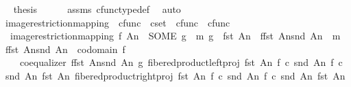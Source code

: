 \begin{isabellebody}
\ \isamarkupfalse%
\ {\isacharquery}{\kern0pt}thesis\isanewline
\ \ \ \ \isamarkupfalse%
\ assms{\isacharparenleft}{\kern0pt}{}{\isacharparenright}{\kern0pt}\ cfunc{\isacharunderscore}{\kern0pt}type{\isacharunderscore}{\kern0pt}def\ \isamarkupfalse%
\ auto\isanewline
{}\isamarkupfalse%
%
\endisatagproof
{\isafoldproof}%
%
\isadelimproof
\isanewline
%
\endisadelimproof
\isanewline
{}\isamarkupfalse%
\ image{\isacharunderscore}{\kern0pt}restriction{\isacharunderscore}{\kern0pt}mapping\ {\isacharcolon}{\kern0pt}{\isacharcolon}{\kern0pt}\ {\isachardoublequoteopen}cfunc\ {\isasymRightarrow}\ cset\ {\isasymtimes}\ cfunc\ {\isasymRightarrow}\ cfunc{\isachardoublequoteclose}\ {\isacharparenleft}{\kern0pt}{\isachardoublequoteopen}{\isacharunderscore}{\kern0pt}{\isasymrestriction}\isactrlbsub {\isacharunderscore}{\kern0pt}\isactrlesub {\isachardoublequoteclose}\ {\isacharbrackleft}{\kern0pt}{}{}{}{\isacharcomma}{\kern0pt}{}{\isacharbrackright}{\kern0pt}{}{}{}{\isacharparenright}{\kern0pt}\ \isanewline
\ \ {\isachardoublequoteopen}image{\isacharunderscore}{\kern0pt}restriction{\isacharunderscore}{\kern0pt}mapping\ f\ An\ {\isacharequal}{\kern0pt}\ {\isacharparenleft}{\kern0pt}SOME\ g{\isachardot}{\kern0pt}\ {\isasymexists}\ m{\isachardot}{\kern0pt}\ g\ {\isacharcolon}{\kern0pt}\ fst\ An\ {\isasymrightarrow}\ f{\isasymlparr}fst\ An{\isasymrparr}\isactrlbsub snd\ An\isactrlesub \ {\isasymand}\ m\ {\isacharcolon}{\kern0pt}\ f{\isasymlparr}fst\ An{\isasymrparr}\isactrlbsub snd\ An\isactrlesub \ {\isasymrightarrow}\ codomain\ f\ {\isasymand}\isanewline
\ \ \ \ coequalizer\ {\isacharparenleft}{\kern0pt}f{\isasymlparr}fst\ An{\isasymrparr}\isactrlbsub snd\ An\isactrlesub {\isacharparenright}{\kern0pt}\ g\ {\isacharparenleft}{\kern0pt}fibered{\isacharunderscore}{\kern0pt}product{\isacharunderscore}{\kern0pt}left{\isacharunderscore}{\kern0pt}proj\ {\isacharparenleft}{\kern0pt}fst\ An{\isacharparenright}{\kern0pt}\ {\isacharparenleft}{\kern0pt}f\ {\isasymcirc}\isactrlsub c\ snd\ An{\isacharparenright}{\kern0pt}\ {\isacharparenleft}{\kern0pt}f\ {\isasymcirc}\isactrlsub c\ snd\ An{\isacharparenright}{\kern0pt}\ {\isacharparenleft}{\kern0pt}fst\ An{\isacharparenright}{\kern0pt}{\isacharparenright}{\kern0pt}\ {\isacharparenleft}{\kern0pt}fibered{\isacharunderscore}{\kern0pt}product{\isacharunderscore}{\kern0pt}right{\isacharunderscore}{\kern0pt}proj\ {\isacharparenleft}{\kern0pt}fst\ An{\isacharparenright}{\kern0pt}\ {\isacharparenleft}{\kern0pt}f\ {\isasymcirc}\isactrlsub c\ snd\ An{\isacharparenright}{\kern0pt}\ {\isacharparenleft}{\kern0pt}f\ {\isasymcirc}\isactrlsub c\ snd\ An{\isacharparenright}{\kern0pt}\ {\isacharparenleft}{\kern0pt}fst\ An{\isacharparenright}{\kern0pt}{\isacharparenright}{\kern0pt}\ {\isasymand}\isanewline

\end{isabellebody}
